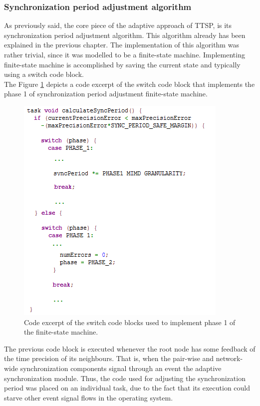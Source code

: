 \subsubsection{Synchronization period adjustment algorithm}
As previously said, the core piece of the adaptive approach of TTSP, is its synchronization period adjustment algorithm. This algorithm already has been explained in the previous chapter. The implementation of this algorithm was rather trivial, since it was modelled to be a finite-state machine. Implementing finite-state machine is accomplished by saving the current state and typically using a switch code block.\\
The Figure \ref{adaptivecode} depicts a code excerpt of the switch code block that implements the phase 1 of synchronization period adjustment finite-state machine.

\begin{figure}[!htb]
\begin{center}
\includegraphics[scale=0.5]{./images/33-ttsp-adaptive_code.png}
\end{center}
\caption{Code excerpt of the switch code blocks used to implement phase 1 of the finite-state machine.}
\label{adaptivecode}
\end{figure}

The previous code block is executed whenever the root node has some feedback of the time precision of its neighbours. That is, when the pair-wise and network-wide synchronization components signal through an event the adaptive synchronization module. Thus, the code used for adjusting the synchronization period was placed on an individual task, due to the fact that its execution could starve other event signal flows in the operating system.

